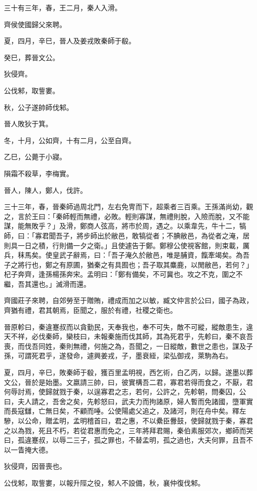 \begin{pinyinscope}
三十有三年，春，王二月，秦人入滑。

齊侯使國歸父來聘。

夏，四月，辛巳，晉人及姜戎敗秦師于殽。

癸巳，葬晉文公。

狄侵齊。

公伐邾，取訾婁。

秋，公子遂帥師伐邾。

晉人敗狄于箕。

冬，十月，公如齊，十有二月，公至自齊。

乙巳，公薨于小寢。

隕霜不殺草，李梅實。

晉人，陳人，鄭人，伐許。

三十三年，春，晉秦師過周北門，左右免冑而下，超乘者三百乘。王孫滿尚幼，觀之，言於王曰：「秦師輕而無禮，必敗。輕則寡謀，無禮則脫，入險而脫，又不能謀，能無敗乎？」及滑，鄭商人弦高，將市於周，遇之。以乘韋先，牛十二，犒師，曰：「寡君聞吾子，將步師出於敝邑，敢犒從者；不腆敝邑，為從者之淹，居則具一日之積，行則備一夕之衛。」且使遽告于鄭。鄭穆公使視客館，則束載，厲兵，秣馬矣。使皇武子辭焉，曰：「吾子淹久於敝邑，唯是脯資，餼牽竭矣。為吾子之將行也，鄭之有原圃，猶秦之有具囿也；吾子取其麋鹿，以閒敝邑，若何？」杞子奔齊，逢孫楊孫奔宋。孟明曰：「鄭有備矣，不可冀也。攻之不克，圍之不繼，吾其還也。」滅滑而還。

齊國莊子來聘，自郊勞至于贈賄，禮成而加之以敏，臧文仲言於公曰，國子為政，齊猶有禮，君其朝焉，臣聞之，服於有禮，社稷之衛也。

晉原軫曰，秦違蹇叔而以貪勤民，天奉我也，奉不可失，敵不可縱，縱敵患生，違天不祥，必伐秦師，欒枝曰，未報秦施而伐其師，其為死君乎，先軫曰，秦不哀吾喪，而伐吾同姓，秦則無禮，何施之為，吾聞之，一日縱敵，數世之患也，謀及子孫，可謂死君乎，遂發命，遽興姜戎，子，墨衰絰，梁弘御戎，萊駒為右。

夏，四月，辛巳，敗秦師于殽，獲百里孟明視，西乞術，白乙丙，以歸。遂墨以葬文公，晉於是始墨。文嬴請三帥，曰，彼實構吾二君，寡君若得而食之，不厭，君何辱討焉，使歸就戮于秦，以逞寡君之志，若何，公許之，先軫朝，問秦囚，公曰，夫人請之，吾舍之矣，先軫怒曰，武夫力而拘諸原，婦人暫而免諸國，墮軍實而長寇讎，亡無日矣，不顧而唾。公使陽處父追之，及諸河，則在舟中矣。釋左驂，以公命，贈孟明，孟明稽首曰，君之惠，不以纍臣釁鼓，使歸就戮于秦，寡君之以為戮，死且不朽，若從君惠而免之，三年將拜君賜，秦伯素服郊次，鄉師而哭曰，孤違蹇叔，以辱二三子，孤之罪也，不替孟明，孤之過也，大夫何罪，且吾不以一眚掩大德。

狄侵齊，因晉喪也。

公伐邾，取訾婁，以報升陘之役，邾人不設備，秋，襄仲復伐邾。


\end{pinyinscope}
